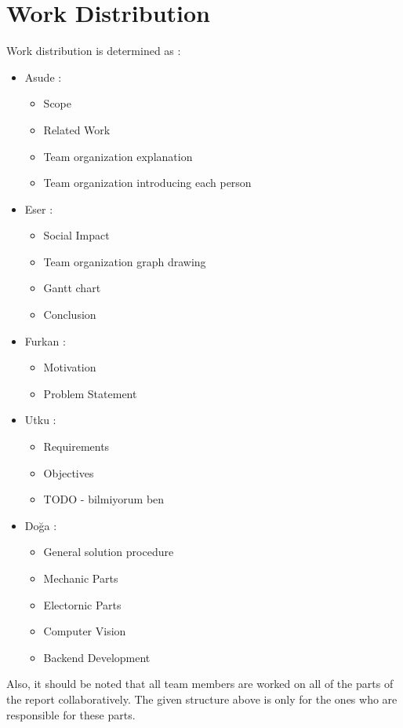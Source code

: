 \section{Work Distribution}
\label{sec:workDistribution}
Work distribution is determined as :
\begin{itemize}
    \item Asude :
    \begin{itemize}
        \item Scope
        \item Related Work
        \item Team organization explanation
        \item Team organization introducing each person
    \end{itemize}
    
    \item Eser :
    \begin{itemize}
        \item Social Impact
        \item Team organization graph drawing
        \item Gantt chart
        \item Conclusion
    \end{itemize}
    
    \item Furkan : 
    \begin{itemize}
        \item Motivation
        \item Problem Statement
    \end{itemize}

    \item Utku :
    \begin{itemize}
        \item Requirements
        \item Objectives
        \item TODO - bilmiyorum ben
    \end{itemize}
    
    \item Doğa : 
    \begin{itemize}
        \item General solution procedure
        \item Mechanic Parts
        \item Electornic Parts
        \item Computer Vision
        \item Backend Development
    \end{itemize}
\end{itemize}

Also, it should be noted that all team members are worked on all of the parts of the report collaboratively. The given structure above is only for the ones who are responsible for these parts.

